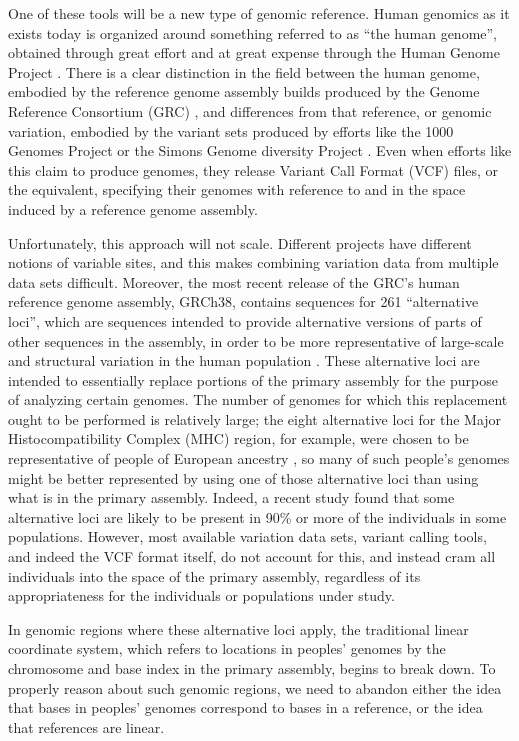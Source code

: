 One of these tools will be a new type of genomic reference. Human genomics as it exists today is organized around something referred to as ``the human genome'', obtained through great effort and at great expense through the Human Genome Project \cite{powledge2003human}. There is a clear distinction in the field between the human genome, embodied by the reference genome assembly builds produced by the Genome Reference Consortium (GRC) \cite{schneider2013genome}, and differences from that reference, or genomic variation, embodied by the variant sets produced by efforts like the 1000 Genomes Project \cite{10002015global} or the Simons Genome diversity Project \cite{simons2014simons}. Even when efforts like this claim to produce genomes, they release Variant Call Format (VCF) files, or the equivalent, specifying their genomes with reference to and in the space induced by a reference genome assembly.

Unfortunately, this approach will not scale. Different projects have different notions of variable sites, and this makes combining variation data from multiple data sets difficult. Moreover, the most recent release of the GRC's human reference genome assembly, GRCh38, contains sequences for 261 ``alternative loci'', which are sequences intended to provide alternative versions of parts of other sequences in the assembly, in order to be more representative of large-scale and structural variation in the human population \cite{karolchik2014new}. These alternative loci are intended to essentially replace portions of the primary assembly for the purpose of analyzing certain genomes. The number of genomes for which this replacement ought to be performed is relatively large; the eight alternative loci for the Major Histocompatibility Complex (MHC) region, for example, were chosen to be representative of people of European ancestry \cite{horton2008variation}, so many of such people's genomes might be better represented by using one of those alternative loci than using what is in the primary assembly. Indeed, a recent study \cite{jager2016alternate} found that some alternative loci are likely to be present in 90\% or more of the individuals in some populations. However, most available variation data sets, variant calling tools, and indeed the VCF format itself, do not account for this, and instead cram all individuals into the space of the primary assembly, regardless of its appropriateness for the individuals or populations under study.

In genomic regions where these alternative loci apply, the traditional linear coordinate system, which refers to locations in peoples' genomes by the chromosome and base index in the primary assembly, begins to break down. To properly reason about such genomic regions, we need to abandon either the idea that bases in peoples' genomes correspond to bases in a reference, or the idea that references are linear.

